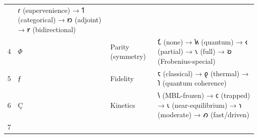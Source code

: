 \begin{longtable}[]{@{}llll@{}}
\begin{minipage}[t]{0.13\columnwidth}
\end{minipage} & \begin{minipage}[t]{0.44\columnwidth}\raggedright
𐑩 (supervenience) → 𐑑 (categorical) → 𐑽 (adjoint) → 𐑾
(bidirectional)\strut
\end{minipage}\tabularnewline
\begin{minipage}[t]{0.07\columnwidth}\raggedright
4\strut
\end{minipage} & \begin{minipage}[t]{0.24\columnwidth}\raggedright
\(Φ\)\strut
\end{minipage} & \begin{minipage}[t]{0.13\columnwidth}\raggedright
Parity (symmetry)\strut
\end{minipage} & \begin{minipage}[t]{0.44\columnwidth}\raggedright
𐑗 (none) → 𐑿 (quantum) → 𐑬 (partial) → 𐑯 (full) → 𐑹
(Frobenius-special)\strut
\end{minipage}\tabularnewline
\begin{minipage}[t]{0.07\columnwidth}\raggedright
5\strut
\end{minipage} & \begin{minipage}[t]{0.24\columnwidth}\raggedright
\(ƒ\)\strut
\end{minipage} & \begin{minipage}[t]{0.13\columnwidth}\raggedright
Fidelity\strut
\end{minipage} & \begin{minipage}[t]{0.44\columnwidth}\raggedright
𐑱 (classical) → 𐑞 (thermal) → 𐑐 (quantum coherence)\strut
\end{minipage}\tabularnewline
\begin{minipage}[t]{0.07\columnwidth}\raggedright
6\strut
\end{minipage} & \begin{minipage}[t]{0.24\columnwidth}\raggedright
\(Ç\)\strut
\end{minipage} & \begin{minipage}[t]{0.13\columnwidth}\raggedright
Kinetics\strut
\end{minipage} & \begin{minipage}[t]{0.44\columnwidth}\raggedright
𐑘 (MBL-frozen) → 𐑤 (trapped) → 𐑧 (near-equilibrium) → 𐑪 (moderate) → 𐑺
(fast/driven)\strut
\end{minipage}\tabularnewline
\begin{minipage}[t]{0.07\columnwidth}\raggedright
7\strut
\end{minipage} & \begin{minipage}[t]{0.24\columnwidth}\raggedright

\end{minipage}
\end{longtable}
